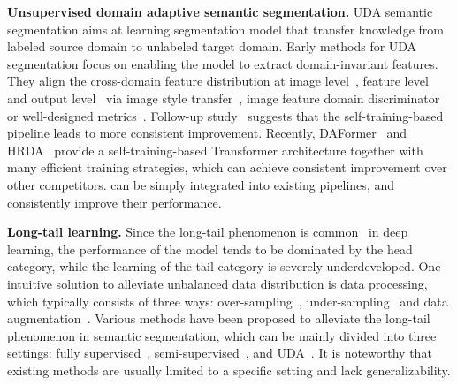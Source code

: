 \noindent\textbf{Unsupervised domain adaptive semantic segmentation.}
%
UDA semantic segmentation aims at learning segmentation model that transfer knowledge from labeled source domain to unlabeled target domain.
%
Early methods for UDA segmentation focus on enabling the model to extract domain-invariant features.
%
They align the cross-domain feature distribution at image level~\cite{hoffman2018cycada, sankaranarayanan2018learning, gong2019dlow}, feature level~\cite{chang2019all, chen2019progressive, li2021semantic, tsai2018learning} and output level~\cite{melas2021pixmatch, vu2019advent, tsai2018learning} via image style transfer~\cite{yang2020fda, guo2021label, hoffman2018cycada, li2019bidirectional, kim2020learning}, image feature domain discriminator~\cite{tsai2019domain, gan, nowozin2016f, pan2020unsupervised, wang2020differential} or well-designed metrics~\cite{guo2021metacorrection, long2015learning, lee2019sliced}.
%
Follow-up study~\cite{zhang2021prototypical, chen2022deliberated} suggests that the self-training-based pipeline leads to more consistent improvement.
%
Recently, DAFormer~\cite{hoyer2022daformer} and HRDA~\cite{hoyer2022hrda} provide a self-training-based Transformer architecture together with many efficient training strategies, which can achieve consistent improvement over other competitors.
%
\method can be simply integrated into existing pipelines, and consistently improve their performance.





\noindent\textbf{Long-tail learning.} Since the long-tail phenomenon is common~\cite{yang2022survey} in deep learning, the performance of the model tends to be dominated by the head category, while the learning of the tail category is severely underdeveloped.
%
One intuitive solution to alleviate unbalanced data distribution is data processing, which typically consists of three ways: over-sampling~\cite{haixiang2017learning, wu2020forest, peng2020large, gupta2019lvis}, under-sampling~\cite{haixiang2017learning, buda2018systematic, sinha2020class, tan2020equalization} and data augmentation~\cite{zang2021fasa, chu2020feature, liu2022breadcrumbs, chou2020remix}. Various methods have been proposed to alleviate the long-tail phenomenon in semantic segmentation, which can be mainly divided into three settings: fully supervised~\cite{tian2022striking,berman2018lovasz}, semi-supervised~\cite{he2021re, hu2021semi,fan2022ucc}, and UDA~\cite{ruan2019category,zou2018unsupervised,yang2020adversarial,li2022class}. It is noteworthy that existing methods are usually limited to a specific setting and lack generalizability.


